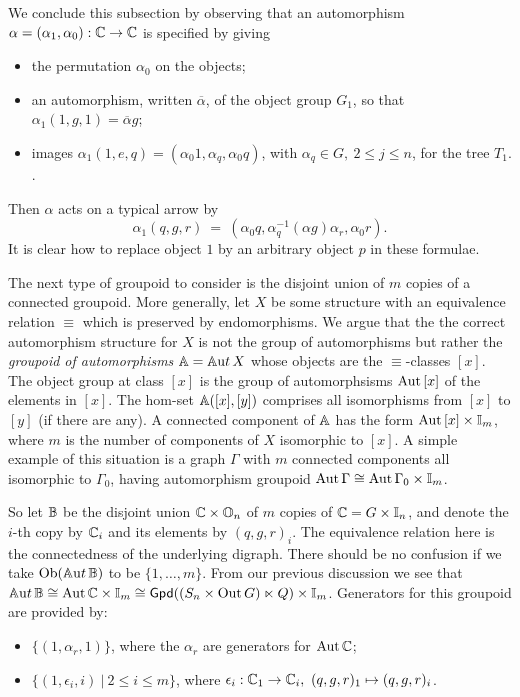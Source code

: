 \bigskip
We conclude this subsection by observing that an automorphism 
$\alpha = (\alpha_1,\alpha_0) : \mathbb{C} \to \mathbb{C}$ is specified by giving 
\begin{itemize}
\item
the permutation $\alpha_0$ on the objects; 
\item
an automorphism, written $\overline{\alpha}$, of the object group $G_1$, 
so that $\alpha_1(1,g,1) = \overline{\alpha} g$; 
\item
images $\alpha_1(1,e,q) = (\alpha_0 1, \alpha_q, \alpha_0 q)$, 
with $\alpha_q \in G,~ 2 \leqslant j \leqslant n$, 
for the tree $T_1$. . 
\end{itemize}
Then $\alpha$ acts on a typical arrow by 
$$
\alpha_1(q,g,r) ~=~ (\alpha_0 q, \alpha_q^{-1}(\alpha g)\alpha_r, \alpha_0 r). 
$$
It is clear how to replace object $1$ by an arbitrary object $p$ 
in these formulae. 


\bigskip
The next type of groupoid to consider is the disjoint union of $m$ 
copies of a connected groupoid. 
More generally, let $X$ be some structure with an equivalence relation 
$\equiv$ which is preserved by endomorphisms. 
We argue that the the correct automorphism structure for $X$ is not the 
group of automorphisms but rather the \emph{groupoid of automorphisms} 
$\mathbb{A} = \mathbb{A}{\mathrm ut}\,X$ whose objects are the $\equiv$-classes $[x]$. 
The object group at class $[x]$ is the group of automorphsisms 
$\mathrm{Aut}\,[x]$ of the elements in $[x]$. 
The hom-set $\mathbb{A}([x],[y])$ comprises all isomorphisms from $[x]$ 
to $[y]$ (if there are any). 
A connected component of $\mathbb{A}$ has the form $\mathrm{Aut}\,[x] \times \mathbb{I}_m$, 
where $m$ is the number of components of $X$ isomorphic to $[x]$. 
A simple example of this situation is a graph $\Gamma$ with $m$ 
connected components all isomorphic to $\Gamma_0$, having 
automorphism groupoid $\mathrm{Aut}\,\Gamma \cong \mathrm{Aut}\,\Gamma_0 \times \mathbb{I}_m$. 

So let $\mathbb{B}$ be the disjoint union $\mathbb{C} \times \mathbb{O}_n$ 
of $m$ copies of $\mathbb{C} = G \times \mathbb{I}_n$, 
and denote the $i$-th copy by $\mathbb{C}_i$ and its elements by $(q,g,r)_i$. 
The equivalence relation here is the connectedness of the underlying digraph. 
There should be no confusion if we take $\mathrm{Ob}(\mathbb{A}{\mathrm ut}\,\mathbb{B})$ 
to be $\{1,\ldots,m\}$. 
From our previous discussion we see that 
$\mathbb{A}{\mathrm ut}\,\mathbb{B} \cong \mathrm{Aut}\,\mathbb{C} \times \mathbb{I}_m 
              \cong {\sf Gpd}((S_n \times \mathrm{Out}\,G) \ltimes Q) \times \mathbb{I}_m$. 
Generators for this groupoid are provided by: 
\begin{itemize}
\item
$\{(1,\alpha_r,1)\}$, where the $\alpha_r$ are generators for $\mathrm{Aut}\,\mathbb{C}$; 
\item
$\{(1,\epsilon_i,i) ~|~ 2 \leqslant i \leqslant m\}$, 
where $\epsilon_i : \mathbb{C}_1 \to \mathbb{C}_i,~ (q,g,r)_1 \mapsto (q,g,r)_i$. 
\end{itemize}

